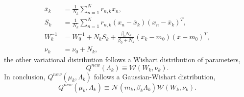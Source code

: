   \[
    \begin{aligned}
      \bar{x}_{k} &= \frac{1}{N_{k}}\sum_{n=1}^{N}r_{n,k}x_{n},\\
      S_{k} &= \frac{1}{N_{k}}\sum_{n=1}^{N}r_{n,k}(x_{n}- \bar{x}_{k})(x_{n} - \bar{x}_{k})^{T},\\
      W_{k}^{-1} &= W_{0}^{-1} + N_{k}S_{k} + \frac{\beta_{0}N_{k}}{\beta_{0} + N_{k}}(\bar{x}_{k} - m_{0})(\bar{x}-m_{0})^{T},\\
      \nu_{k} &= \nu_{0} + N_{k},
    \end{aligned}
  \]
  the other variational distribution follows a Wishart distribution of parameters,
  \[
    Q^{new}(\Lambda_{k}) \equiv \mathcal{W}(W_{k}, \nu_{k}).
  \]
  In conclusion, \(Q^{new}(\mu_{k}, \Lambda_{k})\) follows a Gaussian-Wishart distribution,
  \[
    Q^{new}(\mu_{k}, \Lambda_{k}) \equiv  \mathcal{N}( m_{k}, \beta_{k}\Lambda_{k}) \mathcal{W}(W_{k}, \nu_{k}).
  \]
